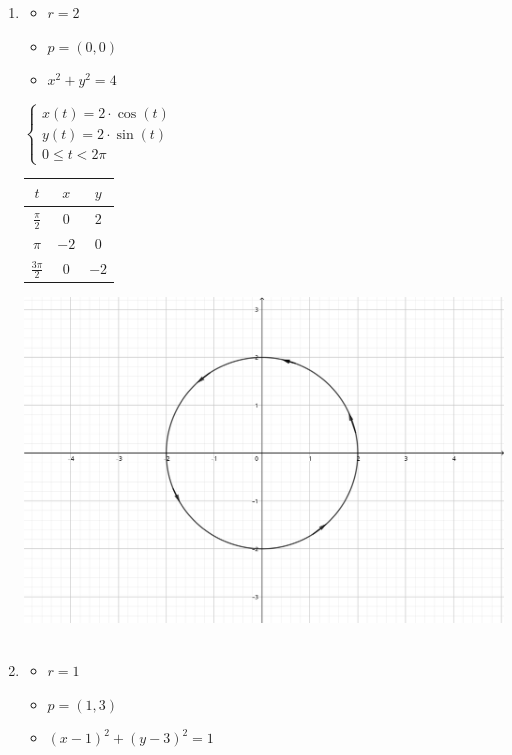 \documentclass[../practica_02.tex]{subfiles}
\begin{document}
    \begin{enumerate}
        \item
            \begin{itemize}
                \item $r = 2$
                \item $p = (0, 0)$
                \item $x^2 + y^2 = 4$
            \end{itemize}

            \quad $\left\{
                \begin{array}{ll}
                    x(t) = 2\cdot\cos(t)\\
                    y(t) = 2\cdot\sin(t)\\
                    0 \leq t < 2\pi
                \end{array}
            \right.$

            \begin{tabular}{ c|c|c } 
                \hline
                    $t$ & $x$ & $y$ \\
                \hline
                    $\frac{\pi}{2}$     & $0 $ & $2 $ \\ 
                    $\pi$               & $-2$ & $0 $ \\ 
                    $\frac{3\pi}{2}$    & $0 $ & $-2$ \\ 
                \hline
            \end{tabular}

            \includegraphics[scale=0.4]{ej02/resources/ej02a.png} $ $
        \item
            \begin{itemize}
                \item $r = 1$
                \item $p = (1, 3)$
                \item $(x-1)^2 + (y-3)^2 = 1$
            \end{itemize}


\end{enumerate}
\end{document}
